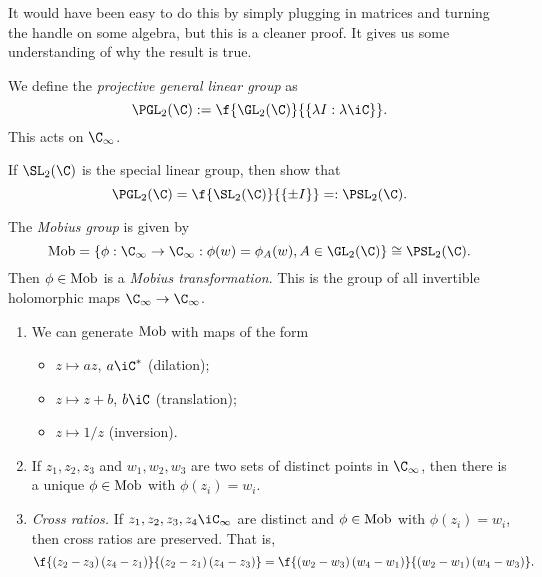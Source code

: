 It would have been easy to do this by simply plugging in matrices and turning the handle on some algebra, but this is a cleaner proof. It gives us some understanding of why the result is true.

	\pagebreak

\begin{corollary}
	We define the \emph{projective general linear group} as
	\begin{equation*}
		\PGL_2(\C) := \f{\GL_2(\C)}{\left\{\lambda I: \lambda\iC\right\}}.
	\end{equation*}
	This acts on $\C_\infty$.
\end{corollary}

\vspace{-3pt}

\begin{exercise}
	If $\SL_2(\C)$ is the special linear group, then show that
	\begin{equation*}
		\PGL_2(\C) = \f{\SL_2(\C)}{\left\{\pm I\right\}} =: \PSL_2(\C).
	\end{equation*}
\end{exercise}

\begin{definition}
	The \emph{Mobius group} is given by
	\begin{equation*}
		\Mobgp = \left\{\phi:\C_\infty \to \C_\infty: \phi(w)=\phi_A(w), A\in\GL_2(\C)\right\} \cong \PSL_2(\C).
	\end{equation*}
	Then $\phi\in\operatorname{Mob}$ is a \emph{Mobius transformation}. This is the group of all invertible holomorphic maps $\C_\infty \to \C_\infty$.
\end{definition}

\begin{lemma}
\mbox{}
\begin{enumerate}
	\item We can generate $\operatorname{Mob}$ with maps of the form
	\begin{itemize}
		\shortskip
		\item $z\mapsto az$, $a\iC^*$ (dilation);
		\item $z\mapsto z+b$, $b\iC$ (translation);
		\item $z\mapsto 1/z$ (inversion).
	\end{itemize}
	\item If $z_1,z_2,z_3$ and $w_1,w_2,w_3$ are two sets of distinct points in $\C_\infty$, then there is a unique $\phi\in\operatorname{Mob}$ with $\phi(z_i)=w_i$.
	\item \emph{Cross ratios.} If $z_1,z_2,z_3,z_4\iC_\infty$ are distinct and $\phi\in\operatorname{Mob}$ with $\phi(z_i)=w_i$, then cross ratios are preserved. That is,
	\begin{equation*}
		\f{\left( z_2-z_3 \right)\left( z_4-z_1 \right)}{\left( z_2-z_1 \right)\left( z_4-z_3 \right)}
		= \f{\left( w_2-w_3 \right)\left( w_4-w_1 \right)}{\left( w_2-w_1 \right)\left( w_4-w_3 \right)}.
	\end{equation*}
\end{enumerate}
\end{lemma}

